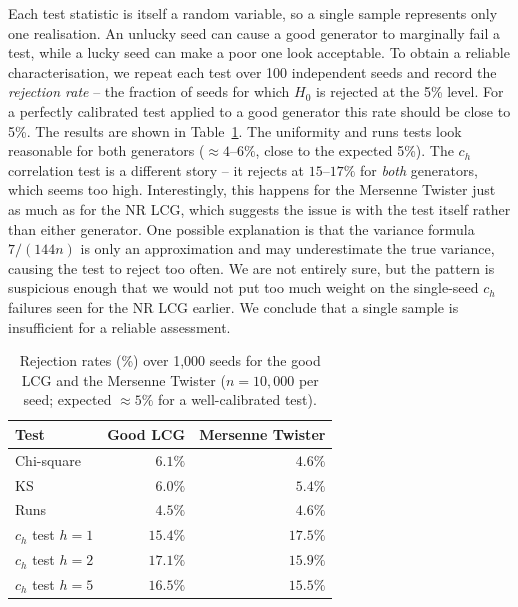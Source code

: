 Each test statistic is itself a random variable, so a single sample
represents only one realisation. An unlucky seed can cause a good generator
to marginally fail a test, while a lucky seed can make a poor one look
acceptable. To obtain a reliable characterisation, we repeat each test over
100 independent seeds and record the \emph{rejection rate} -- the fraction
of seeds for which $H_0$ is rejected at the 5\% level. For a perfectly
calibrated test applied to a good generator this rate should be close to 5\%.
The results are shown in Table~\ref{tab:multiseed}. The uniformity and runs
tests look reasonable for both generators ($\approx 4$--$6\%$, close to the
expected 5\%). The $c_h$ correlation test is a different story -- it rejects
at $15$--$17\%$ for \emph{both} generators, which seems too high. Interestingly,
this happens for the Mersenne Twister just as much as for the NR LCG, which
suggests the issue is with the test itself rather than either generator. One
possible explanation is that the variance formula $7/(144n)$ is only an
approximation and may underestimate the true variance, causing the test to
reject too often. We are not entirely sure, but the pattern is suspicious
enough that we would not put too much weight on the single-seed $c_h$ failures
seen for the NR LCG earlier. We conclude that a single sample is insufficient
for a reliable assessment.

\begin{table}[h]
    \centering
    \caption{Rejection rates (\%) over 1{,}000 seeds for the good LCG and the
             Mersenne Twister ($n = 10{,}000$ per seed; expected $\approx 5\%$
             for a well-calibrated test).}
    \label{tab:multiseed}
    \renewcommand{\arraystretch}{1.1}
    \begin{tabular}{lrr}
        \toprule
        Test                  & Good LCG & Mersenne Twister \\
        \midrule
        Chi-square            & $6.1\%$  & $4.6\%$ \\
        KS                    & $6.0\%$  & $5.4\%$ \\
        Runs                  & $4.5\%$  & $4.6\%$ \\
        $c_h$ test $h = 1$    & $15.4\%$ & $17.5\%$ \\
        $c_h$ test $h = 2$    & $17.1\%$ & $15.9\%$ \\
        $c_h$ test $h = 5$    & $16.5\%$ & $15.5\%$ \\
        \bottomrule
    \end{tabular}
\end{table}

